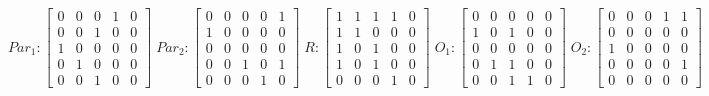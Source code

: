      $$
        Par_{1} : \begin{bmatrix}
            0 & 0 & 0 & 1 & 0 \\
            0 & 0 & 1 & 0 & 0 \\
            1 & 0 & 0 & 0 & 0 \\
			0 & 1 & 0 & 0 & 0 \\
            0 & 0 & 1 & 0 & 0 
        \end{bmatrix}
        \;
        Par_{2} : \begin{bmatrix}
            0 & 0 & 0 & 0 & 1 \\
            1 & 0 & 0 & 0 & 0 \\
            0 & 0 & 0 & 0 & 0 \\
            0 & 0 & 1 & 0 & 1 \\
            0 & 0 & 0 & 1 & 0
        \end{bmatrix}
        \;
        R : \begin{bmatrix}
            1 & 1 & 1 & 1 & 0 \\
            1 & 1 & 0 & 0 & 0 \\
            1 & 0 & 1 & 0 & 0 \\
            1 & 0 & 1 & 0 & 0 \\
            0 & 0 & 0 & 1 & 0
        \end{bmatrix}
        \;
        O_{1} : \begin{bmatrix}
            0 & 0 & 0 & 0 & 0 \\
            1 & 0 & 1 & 0 & 0 \\
            0 & 0 & 0 & 0 & 0 \\
            0 & 1 & 1 & 0 & 0 \\
            0 & 0 & 1 & 1 & 0
        \end{bmatrix}
        \;
        O_{2} : \begin{bmatrix}
            0 & 0 & 0 & 1 & 1 \\
            0 & 0 & 0 & 0 & 0 \\
            1 & 0 & 0 & 0 & 0 \\
            0 & 0 & 0 & 0 & 1 \\
            0 & 0 & 0 & 0 & 0
        \end{bmatrix}
    $$ 
